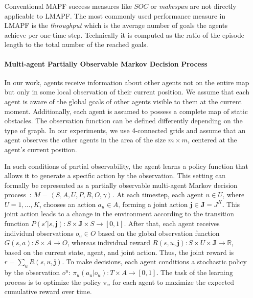 \documentclass[letterpaper]{article} %
\begin{document}
Conventional MAPF success measures like $SOC$ or \emph{makespan} are not directly applicable to LMAPF. The most commonly used performance measure in LMAPF is the \emph{throughput} which is the average number of goals the agents achieve per one-time step. Technically it is computed as the ratio of the episode length to the total number of the reached goals.

\paragraph{Multi-agent Partially Observable Markov Decision Process} In our work, agents receive information about other agents not on the entire map but only in some local observation of their current position. We assume that each agent is aware of the global goals of other agents visible to them at the current moment. Additionally, each agent is assumed to possess a complete map of static obstacles. The observation function can be defined differently depending on the type of graph. In our experiments, we use 4-connected grids and assume that an agent observes the other agents in the area of the size $m\times m$, centered at the agent's current position. 

In such conditions of partial observability, the agent learns a policy function that allows it to generate a specific action by the observation. This setting can formally be represented as a partially observable multi-agent Markov decision process~\cite{bernstein2002complexity,Pack1998}: $M=\left\langle S, A, U, P, R, O, \gamma\right\rangle$.
At each timestep, each agent $u \in U$, where $U = {1, \dots, K}$, chooses an action $a_u \in A$, forming a joint action $\mathbf{j} \in \mathbf{J} = J^K$. This joint action leads to a change in the environment according to the transition function $P(s' | s, \mathbf{j}): S \times \mathbf{J} \times S \rightarrow [0, 1]$. After that, each agent receives individual observations $o_u \in O$ based on the global observation function $G(s, a): S \times A \rightarrow O$, whereas individual reward $R(s, u, \mathbf{j}): S \times U \times \mathbf{J} \rightarrow \mathbb{R}$, based on the current state, agent, and joint action. Thus, the joint reward is $r=\sum_u R(s, u, \mathbf{j})$. To make decisions, each agent conditions a stochastic policy by the observation $o^u$: $\pi_u(a_u | o_u): T \times A \rightarrow [0, 1]$. The task of the learning process is to optimize the policy $\pi_u$ for each agent to maximize the expected cumulative reward over time.
\end{document}

